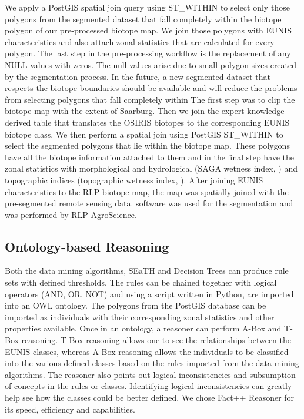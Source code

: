 
We apply a PostGIS spatial join query using ST\_WITHIN to select only those
polygons from the segmented dataset that fall completely within the biotope
polygon of our pre-processed biotope map. We join those polygons
with EUNIS characteristics and also attach zonal statistics that are calculated
for every polygon. The last step in the pre-processing workflow is the
replacement of any NULL values with zeros. 
The null values arise due to small polygon sizes created by the segmentation
process. In the future, a new segmented dataset that respects the biotope
boundaries should be available and will reduce the problems from selecting
polygons that fall completely within
The first step was to clip the biotope map with the extent of Saarburg.
Then we join the expert knowledge-derived table that translates the OSIRIS
biotopes to the corresponding EUNIS biotope class. We then perform a spatial
join using PostGIS ST\_WITHIN to select the segmented polygons that lie within
the biotope map. These polygons have all the biotope information
attached to them and in the final step have the zonal statistics with
morphological and hydrological (SAGA wetness index, ) and topographic indices 
(topographic wetness index, ). 
After joining EUNIS characteristics to the RLP
biotope map, the map was spatially joined with the pre-segmented remote sensing
data. software was used for the segmentation and was performed by RLP AgroScience. 
\subsection{Ontology-based Reasoning}
Both the data mining algorithms, SEaTH and Decision Trees can produce rule
sets with defined thresholds. The rules can be chained together with logical
operators (AND, OR, NOT) and using a script written in Python, are imported
into an OWL ontology. The polygons from the PostGIS database can be imported
as individuals with their corresponding zonal statistics and other properties
available. Once in an ontology, a reasoner can perform A-Box and T-Box
reasoning. T-Box reasoning allows one to see the relationships between the
EUNIS classes, whereas A-Box reasoning allows the individuals to be classified
into the various defined classes based on the rules imported from the data
mining algorithms. The reasoner also points out logical inconsistencies and
subsumption of concepts in the rules or classes. Identifying logical
inconsistencies can greatly help see how the classes
could be better defined.
We chose Fact++ Reasoner for its speed, efficiency and
capabilities.

